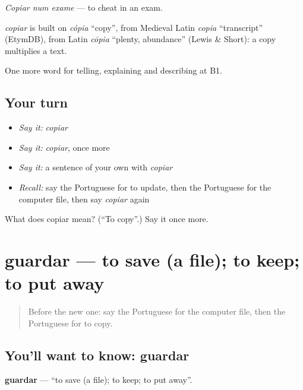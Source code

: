 \emph{Copiar num exame} — to cheat in an exam.

\begin{cousinweb}
\emph{copiar} is built on \emph{cópia} \textquotedblleft{}copy\textquotedblright{}, from Medieval Latin \emph{copia} \textquotedblleft{}transcript\textquotedblright{} (EtymDB), from Latin \emph{cōpia} \textquotedblleft{}plenty, abundance\textquotedblright{} (Lewis \& Short): a copy multiplies a text.
\end{cousinweb}

\begin{grammarlens}[title={What you've built}]
One more word for telling, explaining and describing at B1.
\end{grammarlens}

\subsection*{Your turn}
\begin{itemize}
\raggedright
  \item \emph{Say it:} \emph{copiar}
  \item \emph{Say it:} \emph{copiar}, once more
  \item \emph{Say it:} a sentence of your own with \emph{copiar}
  \item \emph{Recall:} say the Portuguese for to update, then the Portuguese for the computer file, then say \emph{copiar} again
\end{itemize}

\begin{tcolorbox}[breakable,colback=teal!4,colframe=teal!35!black,title={Before you move on}]
What does copiar mean? (\textquotedblleft{}To copy\textquotedblright{}.) Say it once more.
\end{tcolorbox}
\section[guardar]{guardar — to save (a file); to keep; to put away}

\label{lesson:PT-C398-guardar}



\begin{quote}
Before the new one: say the Portuguese for the computer file, then the Portuguese for to copy.
\end{quote}

\subsection*{You'll want to know: guardar}
\textbf{guardar} — \textquotedblleft{}to save (a file); to keep; to put away\textquotedblright{}.

